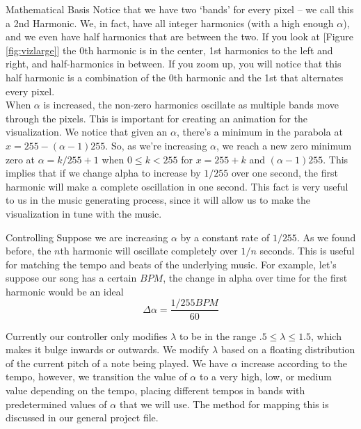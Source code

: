 \documentclass[11pt]{article}
\newcommand{\reffig}[1]{[Figure \ref{#1}]}
\begin{document}
\begin{section}{Mathematical Basis}
Notice that we have two `bands' for every pixel -- we call this a 2nd Harmonic. We, in fact, have all integer harmonics (with a high enough $\alpha$), and we even have half harmonics that are between the two. If you look at \reffig{fig:vizlarge} the 0th harmonic is in the center, 1st harmonics to the left and right, and half-harmonics in between. If you zoom up, you will notice that this half harmonic is a combination of the 0th harmonic and the 1st that alternates every pixel.\\

When $\alpha$ is increased, the non-zero harmonics oscillate as multiple bands move through the pixels. This is important for creating an animation for the visualization. We notice that given an $\alpha$, there's a minimum in the parabola at $x = 255 - (\alpha - 1)255$. So, as we're increasing $\alpha$, we reach a new zero minimum zero at $\alpha = k/255 + 1$ when $0 \le k < 255$ for $x = 255 + k$ and $(\alpha -1)255$. This implies that if we change alpha to increase by $1/255$ over one second, the first harmonic will make a complete oscillation in one second. This fact is very useful to us in the music generating process, since it will allow us to make the visualization in tune with the music. 
\end{section}
\begin{section}{Controlling}
Suppose we are increasing $\alpha$ by a constant rate of $1/255$. As we found before, the $n$th harmonic will oscillate completely over $1/n$ seconds. This is useful for matching the tempo and beats of the underlying music. For example, let's suppose our song has a certain $BPM$, the change in alpha over time for the first harmonic would be an ideal 
\[\Delta \alpha = \frac{1/255 BPM}{60}\]

Currently our controller only modifies $\lambda$ to be in the range $.5 \le \lambda \le 1.5$, which makes it bulge inwards or outwards. We modify $\lambda$ based on a floating distribution of the current pitch of a note being played. We have $\alpha$ increase according to the tempo, however, we transition the value of $\alpha$ to a very high, low, or medium value depending on the tempo, placing different tempos in bands with predetermined values of $\alpha$ that we will use. The method for mapping this is discussed in our general project file. 
\end{section}
\end{document}
